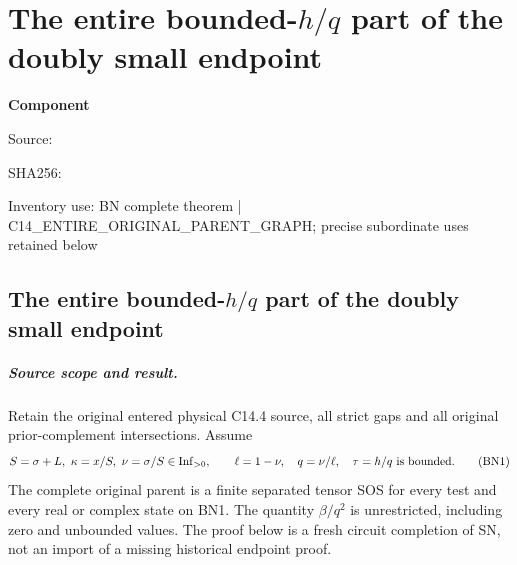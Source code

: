 \chapter{The entire bounded-$h/q$ part of the doubly small endpoint}
\label{component:p80b0c5b9879f}
\noindent\textbf{Component }\par
{\small\noindent Source: \par}
{\small\noindent SHA256: \par}
{\small\noindent Inventory use: BN complete theorem | C14\_\allowbreak{}ENTIRE\_\allowbreak{}ORIGINAL\_\allowbreak{}PARENT\_\allowbreak{}GRAPH; precise subordinate uses retained below\par}
\medskip
\section{The entire bounded-$h/q$ part of the doubly small endpoint}
\label{p80b0c5b9879f:sec:new-c144-bounded-h-ratio}

\paragraph{Source scope and result.}
Retain the original entered physical C14.4 source, all strict gaps and
all original prior-complement intersections. Assume
\[
 S=\sigma+L,\ \kappa=x/S,\ \nu=\sigma/S
       \in\operatorname{Inf}_{>0},\qquad
 \ell=1-\nu,\quad q=\nu/\ell,\quad
 \tau=h/q\ \hbox{is bounded}.
 \tag{BN1}
\]
The complete original parent is a finite separated tensor SOS for
every test and every real or complex state on BN1. The quantity
$\beta/q^2$ is unrestricted, including zero and unbounded values.
The proof below is a fresh circuit completion of SN, not an import of
a missing historical endpoint proof.

